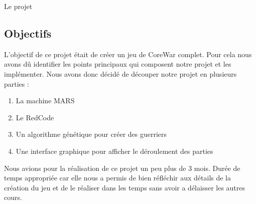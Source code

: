 \documentclass[a4paper, 10pt]{article}
\begin{document}
    \begin{section}{Le projet} \label{sec:projet}
        
        \subsection{Objectifs}
            \par
                L'objectif de ce projet était de créer un jeu de CoreWar complet. Pour cela nous avons dû identifier les points principaux qui composent notre projet et les implémenter. Nous avons donc décidé de découper notre projet en plusieurs parties :
                \smallskip
                \begin{enumerate}
                    \item La machine MARS
                    \item Le RedCode
                    \item Un algorithme génétique pour créer des guerriers
                    \item Une interface graphique pour afficher le déroulement des parties
                \end{enumerate}
                \medskip
                Nous avions pour la réalisation de ce projet un peu plus de 3 mois. Durée de temps appropriée car elle nous a permis de bien réfléchir aux détails de la création du jeu et de le réaliser dans les temps sans avoir a délaisser les autres cours.
                \bigskip


\end{section}
\end{document}
